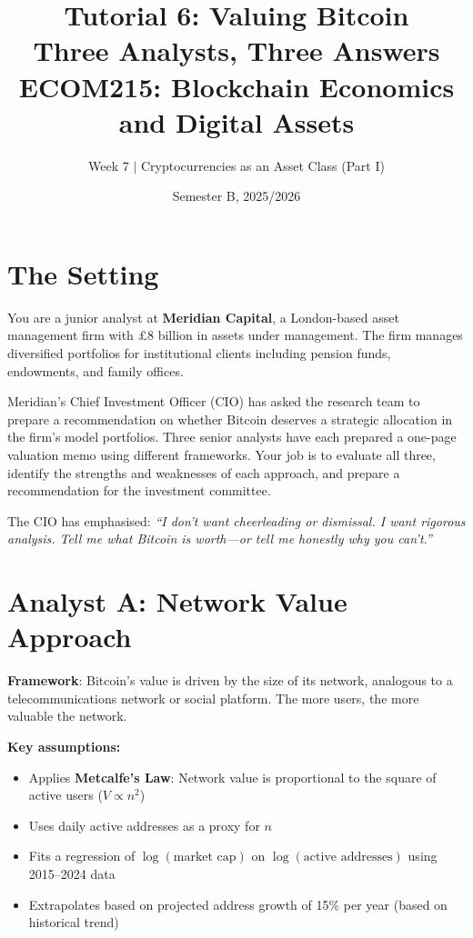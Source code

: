 \documentclass[11pt]{article}
\title{Tutorial 6: Valuing Bitcoin\\[0.3em] \Large Three Analysts, Three Answers\\[1em] \normalsize ECOM215: Blockchain Economics and Digital Assets}
\author{Week 7 $\vert$ Cryptocurrencies as an Asset Class (Part I)}
\date{Semester B, 2025/2026}
\begin{document}
\maketitle

\vspace{1em}
\begin{center}
\end{center}

\section*{The Setting}

You are a junior analyst at \textbf{Meridian Capital}, a London-based asset management firm with \pounds 8 billion in assets under management. The firm manages diversified portfolios for institutional clients including pension funds, endowments, and family offices.

Meridian's Chief Investment Officer (CIO) has asked the research team to prepare a recommendation on whether Bitcoin deserves a strategic allocation in the firm's model portfolios. Three senior analysts have each prepared a one-page valuation memo using different frameworks. Your job is to evaluate all three, identify the strengths and weaknesses of each approach, and prepare a recommendation for the investment committee.

The CIO has emphasised: \textit{``I don't want cheerleading or dismissal. I want rigorous analysis. Tell me what Bitcoin is worth---or tell me honestly why you can't.''}

\section*{Analyst A: Network Value Approach}

\textbf{Framework}: Bitcoin's value is driven by the size of its network, analogous to a telecommunications network or social platform. The more users, the more valuable the network.

\medskip
\noindent\textbf{Key assumptions:}
\begin{itemize}[leftmargin=*]
\item Applies \textbf{Metcalfe's Law}: Network value is proportional to the square of active users ($V \propto n^2$)
\item Uses daily active addresses as a proxy for $n$
\item Fits a regression of $\log(\text{market cap})$ on $\log(\text{active addresses})$ using 2015--2024 data
\item Extrapolates based on projected address growth of 15\% per year (based on historical trend)
\end{itemize}
\end{document}
